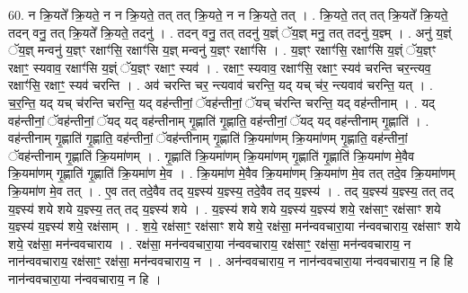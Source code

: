 \documentclass[17pt]{extarticle}
\begin{document}
60. न क्रि॒यते᳚ क्रि॒यते॒ न न क्रि॒यते॒ तत् तत् क्रि॒यते॒ न न क्रि॒यते॒ तत् । . क्रि॒यते॒ तत् तत् क्रि॒यते᳚ क्रि॒यते॒ तदन् वनु॒ तत् क्रि॒यते᳚ क्रि॒यते॒ तदनु॑ । . तदन् वनु॒ तत् तदनु॑ य॒ज्ञ्ं ॅय॒ज्ञ् मनु॒ तत् तदनु॑ य॒ज्ञ्म् । . अनु॑ य॒ज्ञ्ं ॅय॒ज्ञ् मन्वनु॑ य॒ज्ञ्ꣳ रक्षाꣳ॑सि॒ रक्षाꣳ॑सि य॒ज्ञ् मन्वनु॑ य॒ज्ञ्ꣳ रक्षाꣳ॑सि । . य॒ज्ञ्ꣳ रक्षाꣳ॑सि॒ रक्षाꣳ॑सि य॒ज्ञ्ं ॅय॒ज्ञ्ꣳ रक्षाꣳ॒॒ स्यवाव॒ रक्षाꣳ॑सि य॒ज्ञ्ं ॅय॒ज्ञ्ꣳ रक्षाꣳ॒॒ स्यव॑ । . रक्षाꣳ॒॒ स्यवाव॒ रक्षाꣳ॑सि॒ रक्षाꣳ॒॒ स्यव॑ चरन्ति चर॒न्त्यव॒ रक्षाꣳ॑सि॒ रक्षाꣳ॒॒ स्यव॑ चरन्ति । . अव॑ चरन्ति चर॒ न्त्यवाव॑ चरन्ति॒ यद् यच् च॑र॒ न्त्यवाव॑ चरन्ति॒ यत् । . च॒र॒न्ति॒ यद् यच् च॑रन्ति चरन्ति॒ यद् वह॑न्तीनां॒ ॅवह॑न्तीनां॒ ॅयच् च॑रन्ति चरन्ति॒ यद् वह॑न्तीनाम् । . यद् वह॑न्तीनां॒ ॅवह॑न्तीनां॒ ॅयद् यद् वह॑न्तीनाम् गृ॒ह्णाति॑ गृ॒ह्णाति॒ वह॑न्तीनां॒ ॅयद् यद् वह॑न्तीनाम् गृ॒ह्णाति॑ । . वह॑न्तीनाम् गृ॒ह्णाति॑ गृ॒ह्णाति॒ वह॑न्तीनां॒ ॅवह॑न्तीनाम् गृ॒ह्णाति॑ क्रि॒यमा॑णम् क्रि॒यमा॑णम् गृ॒ह्णाति॒ वह॑न्तीनां॒ ॅवह॑न्तीनाम् गृ॒ह्णाति॑ क्रि॒यमा॑णम् । . गृ॒ह्णाति॑ क्रि॒यमा॑णम् क्रि॒यमा॑णम् गृ॒ह्णाति॑ गृ॒ह्णाति॑ क्रि॒यमा॑ण मे॒वैव क्रि॒यमा॑णम् गृ॒ह्णाति॑ गृ॒ह्णाति॑ क्रि॒यमा॑ण मे॒व । . क्रि॒यमा॑ण मे॒वैव क्रि॒यमा॑णम् क्रि॒यमा॑ण मे॒व तत् तदे॒व क्रि॒यमा॑णम् क्रि॒यमा॑ण मे॒व तत् । . ए॒व तत् तदे॒वैव तद् य॒ज्ञ्स्य॑ य॒ज्ञ्स्य॒ तदे॒वैव तद् य॒ज्ञ्स्य॑ । . तद् य॒ज्ञ्स्य॑ य॒ज्ञ्स्य॒ तत् तद् य॒ज्ञ्स्य॑ शये शये य॒ज्ञ्स्य॒ तत् तद् य॒ज्ञ्स्य॑ शये । . य॒ज्ञ्स्य॑ शये शये य॒ज्ञ्स्य॑ य॒ज्ञ्स्य॑ शये॒ रक्ष॑साꣳ॒॒ रक्ष॑साꣳ शये य॒ज्ञ्स्य॑ य॒ज्ञ्स्य॑ शये॒ रक्ष॑साम् । . श॒ये॒ रक्ष॑साꣳ॒॒ रक्ष॑साꣳ शये शये॒ रक्ष॑सा॒ मन॑न्ववचारा॒या न॑न्ववचाराय॒ रक्ष॑साꣳ शये शये॒ रक्ष॑सा॒ मन॑न्ववचाराय । . रक्ष॑सा॒ मन॑न्ववचारा॒या न॑न्ववचाराय॒ रक्ष॑साꣳ॒॒ रक्ष॑सा॒ मन॑न्ववचाराय॒ न नान॑न्ववचाराय॒ रक्ष॑साꣳ॒॒ रक्ष॑सा॒ मन॑न्ववचाराय॒ न । . अन॑न्ववचाराय॒ न नान॑न्ववचारा॒या न॑न्ववचाराय॒ न हि हि नान॑न्ववचारा॒या न॑न्ववचाराय॒ न हि । \newline
\end{document}
